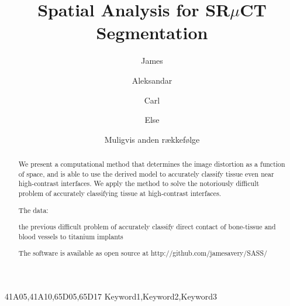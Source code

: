 \documentclass[times,twocolumn,final]{elsarticle}
\begin{document}

\begin{frontmatter}

\title{Spatial Analysis for SR$\mu$CT Segmentation}%

\author[1]{James }
\author[3]{Aleksandar }
\author[1]{Carl }
\author[4]{Else }
\author{Muligvis anden rækkefølge}

\address[1]{University of Copenhagen, Department of Computer Science}
\address[2]{University of Copenhagen, Niels Bohr Institute}
\address[3]{Qtechnology A/S}
\address[4]{University of Southern Denmark}



\begin{abstract}
  We present a computational method that determines the image distortion as a function of space,
  and is able to use the derived model to accurately classify tissue even near high-contrast
  interfaces.
  We apply the method to solve the notoriously difficult problem of accurately classifying
  tissue at high-contrast interfaces.

  The data:

  the previous difficult problem of accurately classify direct contact of bone-tissue and
  blood vessels to titanium implants

  The software is available as open source at http://github.com/jamesavery/SASS/
\end{abstract}

\begin{keyword}
\MSC 41A05\sep 41A10\sep 65D05\sep 65D17
\KWD Keyword1\sep Keyword2\sep Keyword3
\end{keyword}

\end{frontmatter}









\end{document}
